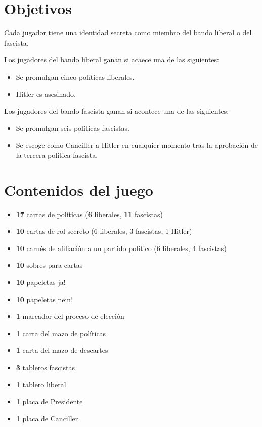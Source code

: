 \documentclass[13pt,a4paper,twocolumn,titlepage]{scrartcl}
\begin{document}
	\section*{Objetivos}
	Cada jugador tiene una identidad secreta como miembro del bando \textcolor{liberal}{​liberal} o del \textcolor{fascist}{​fascista}.
	
	\textcolor{liberal}{​Los jugadores del bando liberal ganan si acaece una de las siguientes:
	\begin{itemize}
		\item Se promulgan cinco políticas liberales.
		\item Hitler es asesinado.
	\end{itemize}
	}

	\textcolor{fascist}{​Los jugadores del bando fascista ganan si acontece una de las siguientes:
	\begin{itemize}
		\item Se promulgan seis políticas fascistas.
		\item Se escoge como Canciller a Hitler en cualquier momento tras la aprobación de la tercera política fascista.
	\end{itemize}
	}

	\section*{Contenidos del juego}
	\begin{itemize}
		\item \textbf{17} cartas de políticas (\textcolor{liberal}{\textbf{6} liberales}, \textcolor{fascist}{\textbf{11} fascistas})
		\item \textbf{10} cartas de rol secreto (6 \textcolor{liberal}{liberales}, 3 \textcolor{fascist}{fascistas}, 1 \textcolor{fascist}{Hitler})
		\item \textbf{10} carnés de afiliación a un partido político (6 \textcolor{liberal}{liberales}, 4 \textcolor{fascist}{fascistas})
		\item \textbf{10} sobres para cartas
		\item \textbf{10} papeletas ja!
		\item \textbf{10} papeletas nein!
		\item \textbf{1} marcador del proceso de elección
		\item \textbf{1} carta del mazo de políticas
		\item \textbf{1} carta del mazo de descartes
		\item \textbf{3} tableros fascistas
		\item \textbf{1} tablero liberal
		\item \textbf{1} placa de Presidente
		\item \textbf{1} placa de Canciller
	\end{itemize}
	
\end{document}
